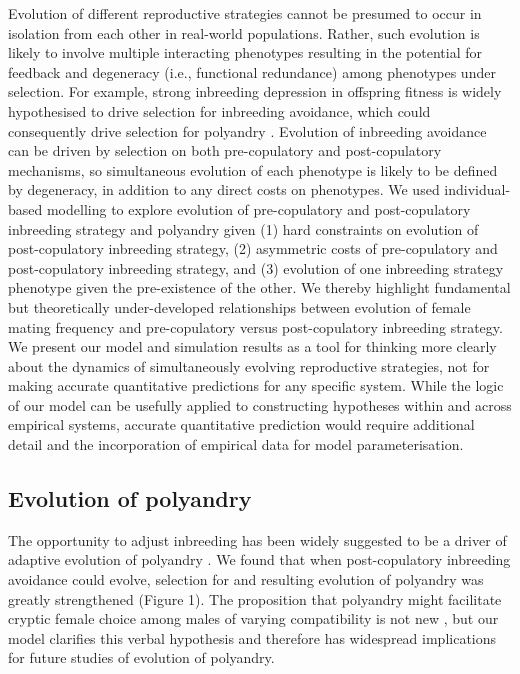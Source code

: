 \documentclass[12pt]{article}
\begin{document}
Evolution of different reproductive strategies cannot be presumed to occur in isolation from each other in real-world populations. Rather, such evolution is likely to involve multiple interacting phenotypes resulting in the potential for feedback and degeneracy (i.e., functional redundance) among phenotypes under selection. For example, strong inbreeding depression in offspring fitness is widely hypothesised to drive selection for inbreeding avoidance, which could consequently drive selection for polyandry \cite[e.g., ][]{Zeh1997, Jennions2000, Tregenza2002}. Evolution of inbreeding avoidance can be driven by selection on both pre-copulatory and post-copulatory mechanisms, so simultaneous evolution of each phenotype is likely to be defined by degeneracy, in addition to any direct costs on phenotypes. We used individual-based modelling to explore evolution of pre-copulatory and post-copulatory inbreeding strategy and polyandry given (1) hard constraints on evolution of post-copulatory inbreeding strategy, (2) asymmetric costs of pre-copulatory and post-copulatory inbreeding strategy, and (3) evolution of one inbreeding strategy phenotype given the pre-existence of the other. We thereby highlight fundamental but theoretically under-developed relationships between evolution of female mating frequency and pre-copulatory versus post-copulatory inbreeding strategy. We present our model and simulation results as a tool for thinking more clearly about the dynamics of simultaneously evolving reproductive strategies, not for making accurate quantitative predictions for any specific system. While the logic of our model can be usefully applied to constructing hypotheses within and across empirical systems, accurate quantitative prediction would require additional detail and the incorporation of empirical data for model parameterisation.

\subsection*{Evolution of polyandry}

The opportunity to adjust inbreeding has been widely suggested to be a driver of adaptive evolution of polyandry \cite[][]{Tregenza2002, Foerster2003, Akcay2007, Varian-Ramos2012, Kingma2013, Lehtonen2015, Reid2014}. We found that when post-copulatory inbreeding avoidance could evolve, selection for and resulting evolution of polyandry was greatly strengthened (Figure 1). The proposition that polyandry might facilitate cryptic female choice among males of varying compatibility is not new \cite[e.g.,][]{Zeh1997}, but our model clarifies this verbal hypothesis and therefore has widespread implications for future studies of evolution of polyandry. 
\end{document}
